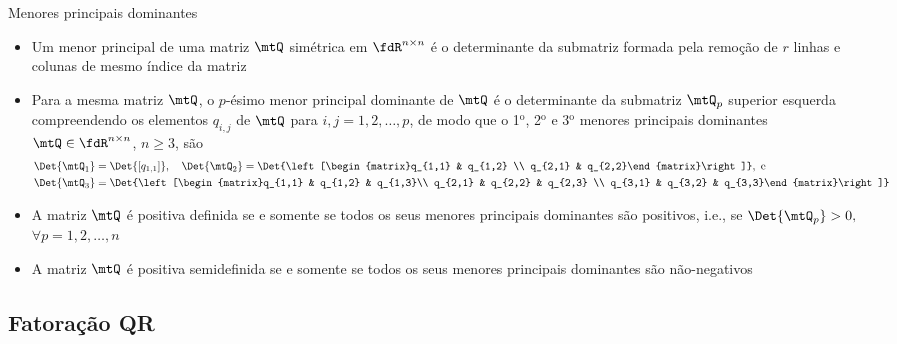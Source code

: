 \begin{frame}{Menores principais dominantes}
  \begin{itemize}\small
    \item Um {\alert{menor principal}} de uma matriz $\mtQ$ simétrica em $\fdR^{n\times n}$ é o determinante da submatriz formada pela remoção de $ r $ linhas e colunas de mesmo índice da matriz
    \item Para a mesma matriz $\mtQ$, o $p$-ésimo {\alert{menor principal dominante}} de $\mtQ$ é o determinante da submatriz $\mtQ_p$ superior esquerda compreendendo os elementos $q_{i,j}$ de $\mtQ$ para $i,j = 1, 2, \ldots, p$, de modo que o 1$^\text{o}$, 2$^\text{o}$ e 3$^\text{o}$ menores principais dominantes $\mtQ \in \fdR^{n\times n}$, $n \geq 3$, são
    {\footnotesize \begin{equation}
      \begin{split}
        \Det{\mtQ_1} &= \Det{\left[q_{1,1}\right]}, \quad \Det{\mtQ_2} = \Det{\left[\begin{matrix}q_{1,1} & q_{1,2} \\ q_{2,1} & q_{2,2}\end{matrix}\right]}, \text{ e } \\
        \Det{\mtQ_3} &= \Det{\left[\begin{matrix}q_{1,1} & q_{1,2} & q_{1,3}\\ q_{2,1} & q_{2,2} & q_{2,3} \\ q_{3,1} & q_{3,2} & q_{3,3}\end{matrix}\right]}
      \end{split}
    \end{equation}}
    \item A matriz $\mtQ$ é positiva definida se e somente se todos os seus menores principais dominantes são positivos, i.e., se $\Det{\mtQ_p} > 0,$ $\forall p = 1, 2, \ldots, n$
    \item A matriz $\mtQ$ é positiva semidefinida se e somente se todos os seus menores principais dominantes são não-negativos
  \end{itemize}
\end{frame}



\subsection{Fatoração QR}

